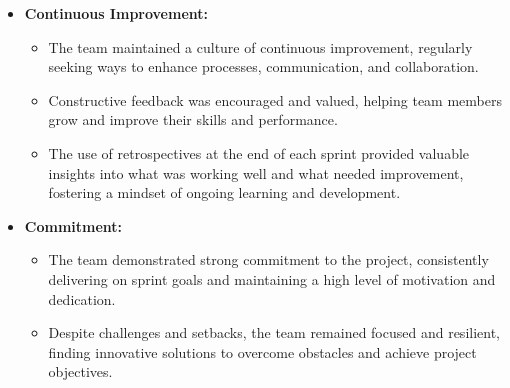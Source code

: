 \documentclass[11pt,a4paper]{article}
\begin{document}
\begin{itemize}
        \item \textbf{Continuous Improvement:}
        \begin{itemize}
            \item The team maintained a culture of continuous improvement, regularly seeking ways to enhance processes, communication, and collaboration.
            \item Constructive feedback was encouraged and valued, helping team members grow and improve their skills and performance.
            \item The use of retrospectives at the end of each sprint provided valuable insights into what was working well and what needed improvement, fostering a mindset of ongoing learning and development.
        \end{itemize}

        \item \textbf{Commitment:}
        \begin{itemize}
            \item The team demonstrated strong commitment to the project, consistently delivering on sprint goals and maintaining a high level of motivation and dedication.
            \item Despite challenges and setbacks, the team remained focused and resilient, finding innovative solutions to overcome obstacles and achieve project objectives.
        \end{itemize}
    \end{itemize}
\end{document}
